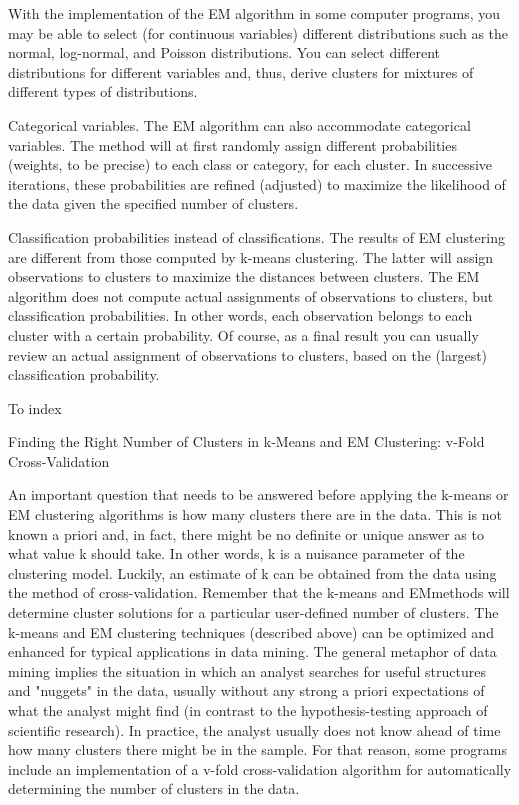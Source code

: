 With the implementation of the EM algorithm in some computer programs, you may be able to select (for continuous variables) different distributions such as the normal, log-normal, and Poisson distributions. You can select different distributions for different variables and, thus, derive clusters for mixtures of different types of distributions.

Categorical variables. The EM algorithm can also accommodate categorical variables. The method will at first randomly assign different probabilities (weights, to be precise) to each class or category, for each cluster. In successive iterations, these probabilities are refined (adjusted) to maximize the likelihood of the data given the specified number of clusters.

Classification probabilities instead of classifications. The results of EM clustering are different from those computed by k-means clustering. The latter will assign observations to clusters to maximize the distances between clusters. The EM algorithm does not compute actual assignments of observations to clusters, but classification probabilities. In other words, each observation belongs to each cluster with a certain probability. Of course, as a final result you can usually review an actual assignment of observations to clusters, based on the (largest) classification probability.







To index
 



 


Finding the Right Number of Clusters in k-Means and EM Clustering: v-Fold Cross-Validation

An important question that needs to be answered before applying the k-means or EM clustering algorithms is how many clusters there are in the data. This is not known a priori and, in fact, there might be no definite or unique answer as to what value k should take. In other words, k is a nuisance parameter of the clustering model. Luckily, an estimate of k can be obtained from the data using the method of cross-validation. Remember that the k-means and EMmethods will determine cluster solutions for a particular user-defined number of clusters. The k-means and EM clustering techniques (described above) can be optimized and enhanced for typical applications in data mining. The general metaphor of data mining implies the situation in which an analyst searches for useful structures and "nuggets" in the data, usually without any strong a priori expectations of what the analyst might find (in contrast to the hypothesis-testing approach of scientific research). In practice, the analyst usually does not know ahead of time how many clusters there might be in the sample. For that reason, some programs include an implementation of a v-fold cross-validation algorithm for automatically determining the number of clusters in the data.

